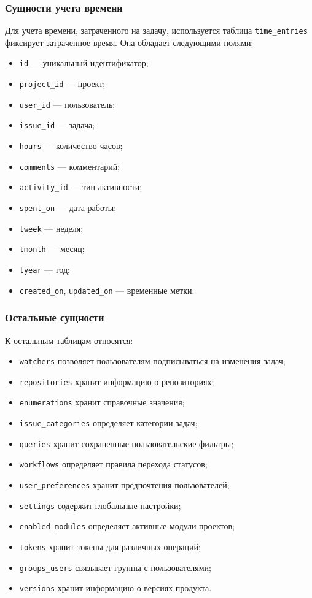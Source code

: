 \subsubsection{Сущности учета времени}

Для учета времени, затраченного на задачу, используется таблица \texttt{time\_entries} фиксирует затраченное время.
Она обладает следующими полями:
\begin{itemize}
    \item \texttt{id} --- уникальный идентификатор;
    \item \texttt{project\_id} --- проект;
    \item \texttt{user\_id} --- пользователь;
    \item \texttt{issue\_id} --- задача;
    \item \texttt{hours} --- количество часов;
    \item \texttt{comments} --- комментарий;
    \item \texttt{activity\_id} --- тип активности;
    \item \texttt{spent\_on} --- дата работы;
    \item \texttt{tweek} --- неделя;
    \item \texttt{tmonth} --- месяц;
    \item \texttt{tyear} --- год;
    \item \texttt{created\_on}, \texttt{updated\_on} --- временные метки.
\end{itemize}

\subsubsection{Остальные сущности}
К остальным таблицам относятся:
\begin{itemize}
    \item \texttt{watchers} позволяет пользователям подписываться на изменения задач;
    \item \texttt{repositories} хранит информацию о репозиториях;
    \item \texttt{enumerations} хранит справочные значения;
    \item \texttt{issue\_categories} определяет категории задач;
    \item \texttt{queries} хранит сохраненные пользовательские фильтры;
    \item \texttt{workflows} определяет правила перехода статусов;
    \item \texttt{user\_preferences} хранит предпочтения пользователей;
    \item \texttt{settings} содержит глобальные настройки;
    \item \texttt{enabled\_modules} определяет активные модули проектов;
    \item \texttt{tokens} хранит токены для различных операций;
    \item \texttt{groups\_users} связывает группы с пользователями;
    \item \texttt{versions} хранит информацию о версиях продукта.
\end{itemize}
